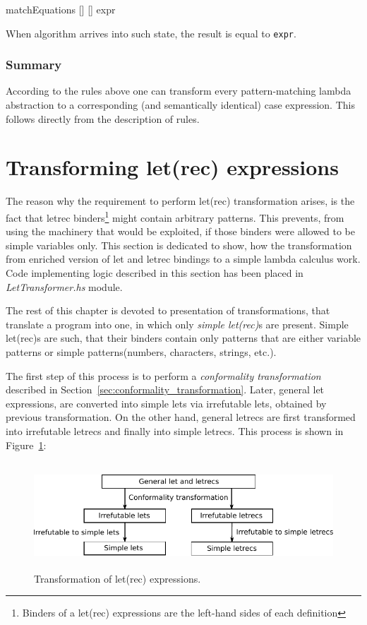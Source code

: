 \documentclass[12pt,a4paper]{report}
\begin{document}
\vspace*{0.2in}
\begin{code}[style=haskell]
  matchEquations [] [] expr
\end{code}

When algorithm arrives into such state, the result is equal to \texttt{expr}.

\subsubsection{Summary}
According to the rules above one can transform every pattern-matching lambda
abstraction to a corresponding (and semantically identical) case expression.
This follows directly from the description of rules.

\section{Transforming let(rec) expressions}
\label{sec:letrec_transform}
The reason why the requirement to perform let(rec) transformation arises, is
the fact that letrec binders\footnote{Binders of a let(rec) expressions are the
left-hand sides of each definition} might contain arbitrary patterns. This
prevents, from using the machinery that would be exploited, if those binders were
allowed to be simple variables only. This section is dedicated to show, how the
transformation from enriched version of let and letrec bindings to a simple
lambda calculus work. Code implementing logic described in this section has
been placed in \textit{LetTransformer.hs} module.

The rest of this chapter is devoted to presentation of transformations, that
translate a program into one, in which only \textit{simple let(rec)}s are
present. Simple let(rec)s are such, that their binders contain only patterns
that are either variable patterns or simple patterns(numbers, characters,
strings, etc.).

The first step of this process is to perform a \textit{conformality
transformation} described in Section~\ref{sec:conformality_transformation}.
Later, general let expressions, are converted into simple lets via irrefutable
lets, obtained by previous transformation. On the other hand, general letrecs
are first transformed into irrefutable letrecs and finally into simple letrecs.
This process is shown in Figure~\ref{fig:letrec_transform}:

\begin{figure}[h!]
  \centering
  \includegraphics[height=4cm]{let_transform}
  \caption{Transformation of let(rec) expressions.}
  \label{fig:letrec_transform}
\end{figure}
\end{document}
